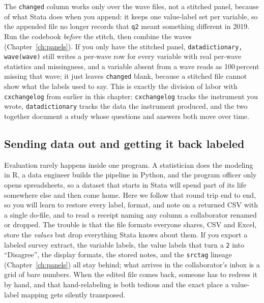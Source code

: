 \documentclass[
    a4paper,
    fontsize=10pt,
    twoside=true,
    numbers=noenddot,
]{kaobook}
\begin{document}
The \texttt{changed} column works only over the wave files, not a stitched panel, because of what Stata does when you append: it keeps one value-label set per variable, so the appended file no longer records that \texttt{q2} meant something different in 2019. Run the codebook \emph{before} the stitch, then combine the waves (Chapter~\ref{ch:panels}). If you only have the stitched panel, \texttt{datadictionary, wave(wave)} still writes a per-wave row for every variable with real per-wave statistics and missingness, and a variable absent from a wave reads as 100\,percent missing that wave; it just leaves \texttt{changed} blank, because a stitched file cannot show what the labels used to say. This is exactly the division of labor with \texttt{cxchangelog} from earlier in this chapter: \texttt{cxchangelog} tracks the instrument you wrote, \texttt{datadictionary} tracks the data the instrument produced, and the two together document a study whose questions and answers both move over time.

\subsection{Sending data out and getting it back labeled}\label{sec:datadictionary-roundtrip}
Evaluation rarely happens inside one program. A statistician does the modeling in R, a data engineer builds the pipeline in Python, and the program officer only opens spreadsheets, so a dataset that starts in Stata will spend part of its life somewhere else and then come home. Here we follow that round trip end to end, so you will learn to restore every label, format, and note on a returned CSV with a single do-file, and to read a receipt naming any column a collaborator renamed or dropped. The trouble is that the file formats everyone shares, CSV and Excel, store the \emph{values} but drop everything Stata knows about them. If you export a labeled survey extract, the variable labels, the value labels that turn a \texttt{2} into \enquote{Disagree}, the display formats, the stored notes, and the \texttt{srctag} lineage (Chapter~\ref{ch:panels}) all stay behind; what arrives in the collaborator's inbox is a grid of bare numbers. When the edited file comes back, someone has to redress it by hand, and that hand-relabeling is both tedious and the exact place a value-label mapping gets silently transposed.
\end{document}
